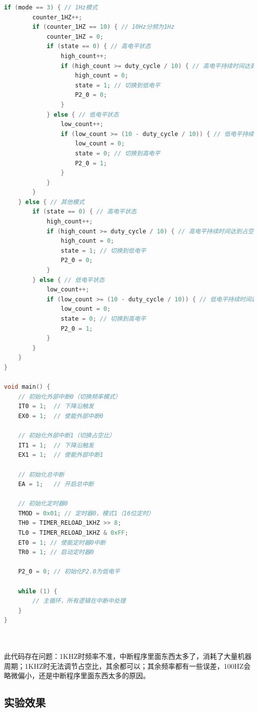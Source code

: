 \documentclass[12pt,hyperref,a4paper,UTF8]{ctexart}
\begin{document}
\begin{lstlisting}[language=C, caption={实验程序}]
    if (mode == 3) { // 1Hz模式
        counter_1HZ++;
        if (counter_1HZ == 10) { // 10Hz分频为1Hz
            counter_1HZ = 0;
            if (state == 0) { // 高电平状态
                high_count++;
                if (high_count >= duty_cycle / 10) { // 高电平持续时间达到占空比
                    high_count = 0;
                    state = 1; // 切换到低电平
                    P2_0 = 0;
                }
            } else { // 低电平状态
                low_count++;
                if (low_count >= (10 - duty_cycle / 10)) { // 低电平持续时间达到占空比
                    low_count = 0;
                    state = 0; // 切换到高电平
                    P2_0 = 1;
                }
            }
        }
    } else { // 其他模式
        if (state == 0) { // 高电平状态
            high_count++;
            if (high_count >= duty_cycle / 10) { // 高电平持续时间达到占空比
                high_count = 0;
                state = 1; // 切换到低电平
                P2_0 = 0;
            }
        } else { // 低电平状态
            low_count++;
            if (low_count >= (10 - duty_cycle / 10)) { // 低电平持续时间达到占空比
                low_count = 0;
                state = 0; // 切换到高电平
                P2_0 = 1;
            }
        }
    }
}

void main() {
    // 初始化外部中断0（切换频率模式）
    IT0 = 1;  // 下降沿触发
    EX0 = 1;  // 使能外部中断0

    // 初始化外部中断1（切换占空比）
    IT1 = 1;  // 下降沿触发
    EX1 = 1;  // 使能外部中断1

    // 初始化总中断
    EA = 1;   // 开启总中断

    // 初始化定时器0
    TMOD = 0x01; // 定时器0，模式1（16位定时）
    TH0 = TIMER_RELOAD_1KHZ >> 8;
    TL0 = TIMER_RELOAD_1KHZ & 0xFF;
    ET0 = 1; // 使能定时器0中断
    TR0 = 1; // 启动定时器0

    P2_0 = 0; // 初始化P2.0为低电平

    while (1) {
        // 主循环，所有逻辑在中断中处理
    }
}
    
    
\end{lstlisting}

此代码存在问题：1KHZ时频率不准，中断程序里面东西太多了，消耗了大量机器周期；1KHZ时无法调节占空比，其余都可以；其余频率都有一些误差，100HZ会略微偏小，还是中断程序里面东西太多的原因。


\subsection{实验效果}
\end{document}
